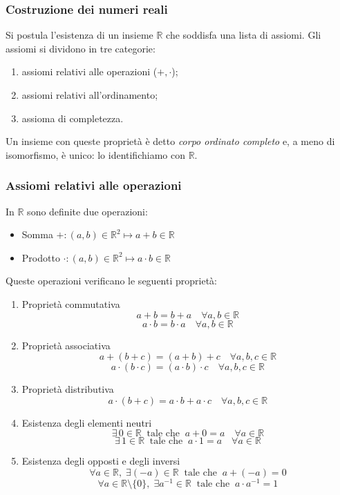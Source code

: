 \subsubsection{Costruzione dei numeri reali}
Si postula l'esistenza di un insieme $\mathbb{R}$ che soddisfa una lista di assiomi.
Gli assiomi si dividono in tre categorie:
\begin{enumerate}[label=\Alph*)]
\item assiomi relativi alle operazioni ($+, \cdot$);
\item assiomi relativi all'ordinamento;
\item assioma di completezza.
\end{enumerate}

Un insieme con queste proprietà è detto \emph{corpo ordinato completo} e, a meno di isomorfismo, è unico: lo identifichiamo con $\mathbb{R}$.

\subsubsection{Assiomi relativi alle operazioni}
In $\mathbb{R}$ sono definite due operazioni:
\begin{itemize}
\item Somma \quad $+ : (a, b) \in \mathbb{R}^2 \mapsto a + b \in \mathbb{R}$
\item Prodotto \quad $\cdot : (a, b) \in \mathbb{R}^2 \mapsto a \cdot b \in \mathbb{R}$
\end{itemize}

Queste operazioni verificano le seguenti proprietà:
\begin{enumerate}
  \renewcommand{\labelenumi}{a\theenumi}

  \item Proprietà commutativa
  \[
    a + b = b + a \quad \forall a, b \in \mathbb{R}
  \]
  \[
    a \cdot b = b \cdot a \quad \forall a, b \in \mathbb{R}
  \]

  \item Proprietà associativa
  \[
    a + (b + c) = (a + b) + c \quad \forall a, b, c \in \mathbb{R}
  \]
  \[
    a \cdot (b \cdot c) = (a \cdot b) \cdot c \quad \forall a, b, c \in \mathbb{R}
  \]

  \item Proprietà distributiva
  \[
    a \cdot (b + c) = a \cdot b + a \cdot c \quad \forall a, b, c \in \mathbb{R}
  \]

  \item Esistenza degli elementi neutri
  \[
    \exists\, 0 \in \mathbb{R} \;\; \text{tale che} \;\; a + 0 = a \quad \forall a \in \mathbb{R}
  \]
  \[
    \exists\, 1 \in \mathbb{R} \;\; \text{tale che} \;\; a \cdot 1 = a \quad \forall a \in \mathbb{R}
  \]

  \item Esistenza degli opposti e degli inversi
  \[
    \forall a \in \mathbb{R}, \; \exists (-a) \in \mathbb{R} \;\; \text{tale che}\;\; a+(-a) = 0
  \]
  \[
    \forall a \in \mathbb{R}\setminus \{0\}, \; \exists a^{-1} \in \mathbb{R} \;\; \text{tale che} \;\; a \cdot a^{-1} = 1
  \]
\end{enumerate}

